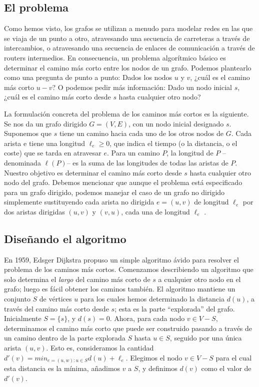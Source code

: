 \documentclass[a4paper, 12pt]{book}
\theoremstyle{dotless}
\begin{document}
\subsection{El problema}

Como hemos visto, los grafos se utilizan a menudo para modelar redes en las que se viaja de un punto a otro, atravesando una secuencia de carreteras a través de intercambios, o atravesando una secuencia de enlaces de comunicación a través de routers intermedios. En consecuencia, un problema algorítmico básico es determinar el camino más corto entre los nodos de un grafo. Podemos plantearlo como una pregunta de punto a punto: Dados los nodos $u$ y $v$, ¿cuál es el camino más corto $u-v$? O podemos pedir más información: Dado un nodo inicial $s$, ¿cuál es el camino más corto desde $s$ hasta cualquier otro nodo?

La formulación concreta del problema de los caminos más cortos es la siguiente. Se nos da un grafo dirigido $G = (V , E)$, con un nodo inicial designado $s$. Suponemos que $s$ tiene un camino hacia cada uno de los otros nodos de $G$. Cada arista e tiene una longitud $\ell_e ≥ 0$, que indica el tiempo (o la distancia, o el coste) que se tarda en atravesar $e$. Para un camino $P$, la longitud de $P$ --denominada $\ell(P)$-- es la suma de las longitudes de todas las aristas de $P$. Nuestro objetivo es determinar el camino más corto desde $s$ hasta cualquier otro nodo del grafo. Debemos mencionar que aunque el problema está especificado para un grafo dirigido, podemos manejar el caso de un grafo no dirigido simplemente sustituyendo cada arista no dirigida $e = (u, v)$ de longitud $\ell_e$ por dos aristas dirigidas $(u, v)$ y $(v, u)$, cada una de longitud $\ell_e$ .


\subsection{Diseñando el algoritmo}

En 1959, Edsger Dijkstra propuso un simple algoritmo ávido para resolver el problema de los caminos más cortos. Comenzamos describiendo un algoritmo que solo determina el \textit{largo} del camino más corto de $s$ a cualquier otro nodo en el grafo; luego es fácil obtener los caminos también. El algoritmo mantiene un conjunto $S$ de vértices $u$ para los cuales hemos determinado la distancia $d(u)$, a través del camino más corto desde $s$; esta es la parte ``explorada'' del grafo. Inicialmente $S=\{s\}$, y $d(s)=0$. Ahora, para cada nodo $v \in V-S$, determinamos el camino más corto que puede ser construido pasando a través de un camino dentro de la parte explorada $S$ hasta $u \in S$, seguido por una única arista $(u,v)$. Esto es, consideramos la cantidad $d'(v) = min_{e=(u,w):u \in S} d (u) + \ell_e$. Elegimos el nodo $v \in V-S$ para el cual esta distancia es la mínima, añadimos $v$ a $S$, y definimos $d(v)$ como el valor de $d'(v)$.
\end{document}
